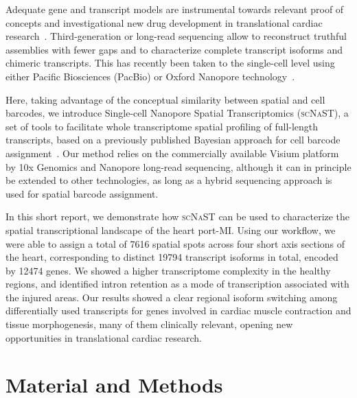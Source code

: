 \documentclass[utf8]{FrontiersinHarvard} %
\newcommand{\scnast}{\textsc{scNaST}\xspace}
\begin{document}
Adequate gene and transcript models are instrumental towards relevant proof of concepts and investigational new drug development in translational cardiac research~\citep{Muller2021:pig_transcriptome}. 
Third-generation or long-read sequencing allow to reconstruct truthful assemblies with fewer gaps and to characterize complete transcript isoforms and chimeric transcripts.
This has recently been taken to the single-cell level using either Pacific Biosciences (PacBio) or Oxford Nanopore technology~\citep{Gupta2018:ScISOr-Seq,Lebrigand2020:sicelore,Volden2020:R2C2_10x,Wang2021:scnapbar,Joglekar2021:spatial_brain}.

Here, taking advantage of the conceptual similarity between spatial and cell barcodes, we introduce Single-cell Nanopore Spatial Transcriptomics (\scnast), a set of tools to facilitate whole transcriptome spatial profiling of full-length transcripts, based on a previously published Bayesian approach for cell barcode assignment~\citep{Wang2021:scnapbar}. Our method relies on the commercially available Visium platform by 10x Genomics and Nanopore long-read sequencing, although it can in principle be extended to other technologies, as long as a hybrid sequencing approach is used for spatial barcode assignment. 

In this short report, we demonstrate how \scnast can be used to characterize the spatial transcriptional landscape of the heart port-MI.
Using our workflow, we were able to assign a total of 7616 spatial spots across four short axis sections of the heart, corresponding to distinct 19794 transcript isoforms in total, encoded by 12474 genes.
We showed a higher transcriptome complexity in the healthy regions, and identified intron retention as a mode of transcription associated with the injured areas.
Our results showed a clear regional isoform switching among differentially used transcripts for genes involved in cardiac muscle contraction and tissue morphogenesis, many of them clinically relevant, opening new opportunities in translational cardiac research.


\section*{Material and Methods}
\end{document}
